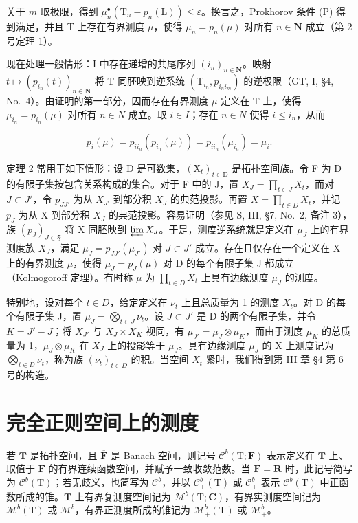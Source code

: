 关于 \(m\) 取极限，得到 \(\mu_n^\bullet (\mathrm{T}_n - p_n(\mathrm{L})) \leqslant \varepsilon\)。换言之，Prokhorov 条件 (P) 得到满足，并且 T 上存在有界测度 \(\mu\)，使得 \(\mu_n = p_n(\mu)\) 对所有 \(n \in \mathbf{N}\) 成立（第 2 号定理 1）。

现在处理一般情形：I 中存在递增的共尾序列 \((i_{n})_{n\in\mathbf{N}}\)。映射 \(t\mapsto\left(p_{i_{n}}(t)\right)_{n\in\mathbf{N}}\) 将 T 同胚映到逆系统 \((\mathrm{T}_{i_{n}},p_{i_{n}i_{m}})\) 的逆极限（GT, I, §4, No.~4）。由证明的第一部分，因而存在有界测度 \(\mu\) 定义在 T 上，使得 \(\mu_{i_{n}}=p_{i_{n}}(\mu)\) 对所有 \(n\in N\) 成立。取 \(i\in I\)；存在 \(n\in N\) 使得 \(i\leqslant i_{n}\)，从而

\[
p _ {i} (\mu) = p _ {i i _ {n}} \left(p _ {i _ {n}} (\mu)\right) = p _ {i i _ {n}} \left(\mu_ {i _ {n}}\right) = \mu_ {i}.\tag{Q.E.D.}
\]

定理 2 常用于如下情形：设 D 是可数集，\((\mathrm{X}_{t})_{t\in\mathrm{D}}\) 是拓扑空间族。令 F 为 D 的有限子集按包含关系构成的集合。对于 F 中的 J，置 \(X_{J}=\prod_{t\in J}X_{t}\)，而对 \(J\subset J'\)，令 \(p_{JJ'}\) 为从 \(X_{J'}\) 到部分积 \(X_{J}\) 的典范投影。再置 \(X=\prod_{t\in D}X_{t}\)，并记 \(p_{J}\) 为从 X 到部分积 \(X_{J}\) 的典范投影。容易证明（参见 S, III, §7, No.~2, 备注 3），族 \((p_{J})_{J\in\mathfrak{F}}\) 将 X 同胚映到 \(\varprojlim X_{J}\)。于是，测度逆系统就是定义在 \(\mu_{J}\) 上的有界测度族 \(X_{J}\)，满足 \(\mu_{J}=p_{JJ'}(\mu_{J'})\) 对 \(J\subset J'\) 成立。存在且仅存在一个定义在 X 上的有界测度 \(\mu\)，使得 \(\mu_{J}=p_{J}(\mu)\) 对 D 的每个有限子集 J 都成立（Kolmogoroff 定理）。有时称 \(\mu\) 为 \(\prod_{t\in D}X_{t}\) 上具有边缘测度 \(\mu_{J}\) 的测度。

特别地，设对每个 \(t \in D\)，给定定义在 \(\nu_{t}\) 上且总质量为 1 的测度 \(X_{t}\)。对 D 的每个有限子集 J，置 \(\mu_{J} = \bigotimes_{t \in J} \nu_{t}\)。设 \(J \subset J'\) 是 D 的两个有限子集，并令 \(K = J' - J\)；将 \(X_{J'}\) 与 \(X_{J} \times X_{K}\) 视同，有 \(\mu_{J'} = \mu_{J} \otimes \mu_{K}\)，而由于测度 \(\mu_{K}\) 的总质量为 1，\(\mu_{J} \otimes \mu_{K}\) 在 \(X_{J}\) 上的投影等于 \(\mu_{J}\)。具有边缘测度 \(\mu_{J}\) 的 X 上测度记为 \(\bigotimes_{t \in D} \nu_{t}\)，称为族 \((\nu_{t})_{t \in D}\) 的积。当空间 \(X_{t}\) 紧时，我们得到第 III 章 §4 第 6 号的构造。

\section{完全正则空间上的测度}

若 \(\mathbf{T}\) 是拓扑空间，且 \(\overline{\mathbf{F}}\) 是 Banach 空间，则记号 \(\mathcal{C}^b (\mathrm{T};\mathbf{F})\) 表示定义在 \(\mathbf{T}\) 上、取值于 \(\mathbf{F}\) 的有界连续函数空间，并赋予一致收敛范数。当 \(\mathbf{F} = \mathbf{R}\) 时，此记号简写为 \(\mathcal{C}^b (\mathrm{T})\)；若无歧义，也简写为 \(\mathcal{C}^b\)，并以 \(\mathcal{C}_+^b (\mathrm{T})\) 或 \(\mathcal{C}_+^b\) 表示 \(\mathcal{C}^b (\mathrm{T})\) 中正函数所成的锥。\(\mathbf{T}\) 上有界复测度空间记为 \(\mathcal{M}^b (\mathrm{T};\mathbf{C})\)，有界实测度空间记为 \(\mathcal{M}^b (\mathrm{T})\) 或 \(\mathcal{M}^b\)，有界正测度所成的锥记为 \(\mathcal{M}_+^b (\mathrm{T})\) 或 \(\mathcal{M}_+^b\)。

